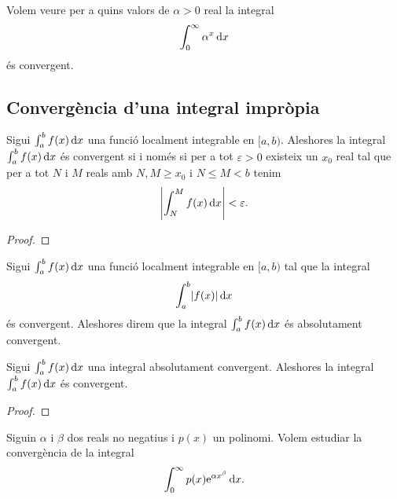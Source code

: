 \documentclass[../../Main.tex]{subfiles}
\begin{document}
	\begin{example}
		\label{ex:criteri de la integral per integrals impròpies}
		Volem veure per a quins valors de \(\alpha>0\) real la integral
		\begin{equation}
			\label{ex:criteri de la integral per integrals impròpies:eq1}
			\int_{0}^{\infty}\alpha^{x}\mathop{}\!\mathrm{d} x
		\end{equation}
		és convergent.
		\begin{solution}
		\end{solution}
	\end{example}
	\subsection{Convergència d'una integral impròpia}
	\begin{theorem}
		\label{thm:Condició de Cauchy per integrals impròpies}
		Sigui \(\int_{a}^{b}f(x)\mathop{}\!\mathrm{d} x\) una funció localment integrable en \([a,b)\). Aleshores la integral \(\int_{a}^{b}f(x)\mathop{}\!\mathrm{d} x\) és convergent si i només si per a tot \(\varepsilon>0\) existeix un \(x_{0}\) real tal que per a tot \(N\) i \(M\) reals amb \(N,M\geq x_{0}\) i \(N\leq M<b\) tenim
		\[\abs{\int_{N}^{M}f(x)\diff x}<\varepsilon.\]
		\begin{proof}
		\end{proof}
	\end{theorem}
	\begin{definition}
		\label{def:convergència absoluta d'una integral impròpia}
		Sigui \(\int_{a}^{b}f(x)\mathop{}\!\mathrm{d} x\) una funció localment integrable en \([a,b)\) tal que la integral
		\[\int_{a}^{b}\abs{f(x)}\diff x\]
		és convergent. Aleshores direm que la integral \(\int_{a}^{b}f(x)\mathop{}\!\mathrm{d} x\) és absolutament convergent.
	\end{definition}
	\begin{proposition}
		Sigui \(\int_{a}^{b}f(x)\mathop{}\!\mathrm{d} x\) una integral absolutament convergent. Aleshores la integral \(\int_{a}^{b}f(x)\mathop{}\!\mathrm{d} x\) és convergent.
		\begin{proof}
		\end{proof}
	\end{proposition}
	\begin{example}
		\label{ex:convèrgencia absoluta d'una integral impròpia amb un polinomi i una exponencial}
		Siguin \(\alpha\) i \(\beta\) dos reals no negatius i \(p(x)\) un polinomi.
		Volem estudiar la convergència de la integral
		\[\int_{0}^{\infty}p(x)\mathrm{e}^{\alpha x^{\beta}}\mathop{}\!\mathrm{d} x.\]
		\begin{solution}
		\end{solution}
	\end{example}
\end{document}

